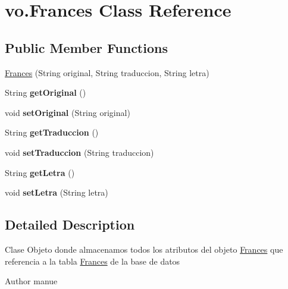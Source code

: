 \hypertarget{classvo_1_1_frances}{}\section{vo.\+Frances Class Reference}
\label{classvo_1_1_frances}
\subsection*{Public Member Functions}
\begin{DoxyCompactItemize}
\item 
\mbox{\hyperlink{classvo_1_1_frances_ae626f2f2ba165fc4d976bd8ea9ddda8f}{Frances}} (String original, String traduccion, String letra)
\item 
\mbox{\label{classvo_1_1_frances_a04441ee8d907a7117c3caf57e1c6ddb3}} 
String {\bfseries get\+Original} ()
\item 
\mbox{\label{classvo_1_1_frances_aa394102667df05f4db175e3c5777cfbe}} 
void {\bfseries set\+Original} (String original)
\item 
\mbox{\label{classvo_1_1_frances_a1dc8dd55a27289743e7de86407a18a9e}} 
String {\bfseries get\+Traduccion} ()
\item 
\mbox{\label{classvo_1_1_frances_a18f376d700134d7fdc61a1f1a8ff24c9}} 
void {\bfseries set\+Traduccion} (String traduccion)
\item 
\mbox{\label{classvo_1_1_frances_ac02b388676637d912d70bf4277cef40e}} 
String {\bfseries get\+Letra} ()
\item 
\mbox{\label{classvo_1_1_frances_a0d566ba69b4612a59bbd2cf34bc4ea69}} 
void {\bfseries set\+Letra} (String letra)
\end{DoxyCompactItemize}


\subsection{Detailed Description}
Clase Objeto donde almacenamos todos los atributos del objeto \mbox{\hyperlink{classvo_1_1_frances}{Frances}} que referencia a la tabla \mbox{\hyperlink{classvo_1_1_frances}{Frances}} de la base de datos \begin{DoxyAuthor}{Author}
manue 
\end{DoxyAuthor}


